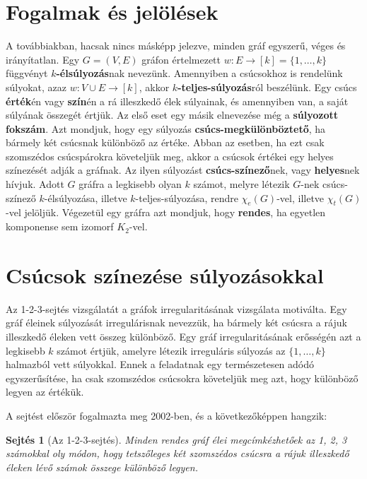 \documentclass[12pt, a4paper]{report}
\newtheorem{sej}[tét]{Sejtés}
\theoremstyle{remark}
\theoremstyle{definition}
\begin{document}
\section{Fogalmak és jelölések}
A továbbiakban, hacsak nincs másképp jelezve, minden gráf egyszerű, véges és irányítatlan. Egy $G = (V, E)$ gráfon értelmezett $w: E \rightarrow [k] = \lbrace 1, \ldots, k \rbrace$ függvényt \textbf{$k$-élsúlyozás}nak nevezünk. Amennyiben a csúcsokhoz is rendelünk súlyokat, azaz $w: V \cup E \rightarrow [k]$, akkor \textbf{$k$-teljes-súlyozás}ról beszélünk. Egy csúcs \textbf{érték}én vagy \textbf{szín}én a rá illeszkedő élek súlyainak, és amennyiben van, a saját súlyának összegét értjük. Az első eset egy másik elnevezése még a \textbf{súlyozott fokszám}. Azt mondjuk, hogy egy súlyozás \textbf{csúcs-megkülönböztető}, ha bármely két csúcsnak különböző az értéke. Abban az esetben, ha ezt csak szomszédos csúcspárokra követeljük meg, akkor a csúcsok értékei egy helyes színezését adják a gráfnak. Az ilyen súlyozást \textbf{csúcs-színező}nek, vagy \textbf{helyes}nek hívjuk. Adott $G$ gráfra a legkisebb olyan $k$ számot, melyre létezik $G$-nek csúcs-színező $k$-élsúlyozása, illetve $k$-teljes-súlyozása, rendre $\chi_e(G)$-vel, illetve $\chi_t(G)$-vel jelöljük. Végezetül egy gráfra azt mondjuk, hogy \textbf{rendes}, ha egyetlen komponense sem izomorf $K_2$-vel.

\section{Csúcsok színezése súlyozásokkal}
Az 1-2-3-sejtés vizsgálatát a gráfok irregularitásának vizsgálata motiválta. Egy gráf éleinek súlyozását irregulárisnak nevezzük, ha bármely két csúcsra a rájuk illeszkedő éleken vett összeg különböző. Egy gráf irregularitásának erősségén azt a legkisebb $k$ számot értjük, amelyre létezik irreguláris súlyozás az $\lbrace 1, \ldots, k \rbrace$ halmazból vett súlyokkal. Ennek a feladatnak egy természetesen adódó egyszerűsítése, ha csak szomszédos csúcsokra követeljük meg azt, hogy különböző legyen az értékük. 

A sejtést először \citeauthor{Karonski2004} \cite{Karonski2004} fogalmazta meg 2002-ben, és a következőképpen hangzik: 

\begin{sej}[Az 1-2-3-sejtés]
Minden rendes gráf élei megcímkézhetőek az 1, 2, 3 számokkal oly módon, hogy tetszőleges két szomszédos csúcsra a rájuk illeszkedő éleken lévő számok összege különböző legyen.
\end{sej}
\end{document}
